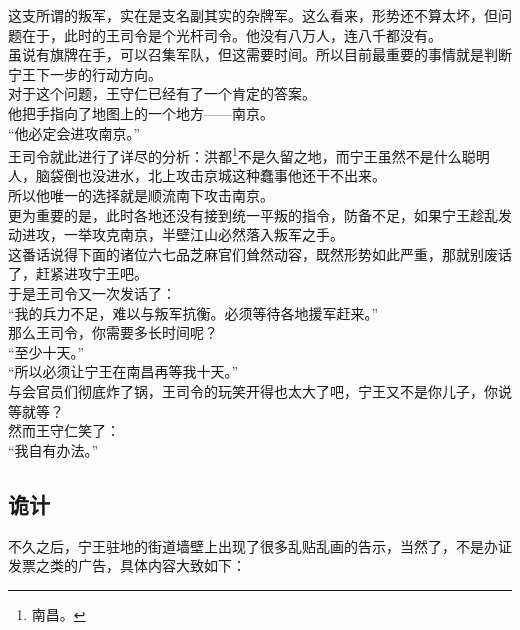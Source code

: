 \begin{multicols}{\theparacolNo}
这支所谓的叛军，实在是支名副其实的杂牌军。这么看来，形势还不算太坏，但问题在于，此时的王司令是个光杆司令。他没有八万人，连八千都没有。\\

虽说有旗牌在手，可以召集军队，但这需要时间。所以目前最重要的事情就是判断宁王下一步的行动方向。\\

对于这个问题，王守仁已经有了一个肯定的答案。\\

他把手指向了地图上的一个地方——南京。\\

“他必定会进攻南京。”\\

王司令就此进行了详尽的分析：洪都\footnote{南昌。}不是久留之地，而宁王虽然不是什么聪明人，脑袋倒也没进水，北上攻击京城这种蠢事他还干不出来。\\

所以他唯一的选择就是顺流南下攻击南京。\\

更为重要的是，此时各地还没有接到统一平叛的指令，防备不足，如果宁王趁乱发动进攻，一举攻克南京，半壁江山必然落入叛军之手。\\

这番话说得下面的诸位六七品芝麻官们耸然动容，既然形势如此严重，那就别废话了，赶紧进攻宁王吧。\\

于是王司令又一次发话了：\\

“我的兵力不足，难以与叛军抗衡。必须等待各地援军赶来。”\\

那么王司令，你需要多长时间呢？\\

“至少十天。”\\

“所以必须让宁王在南昌再等我十天。”\\

与会官员们彻底炸了锅，王司令的玩笑开得也太大了吧，宁王又不是你儿子，你说等就等？\\

然而王守仁笑了：\\

“我自有办法。”\\

\subsection{诡计}
不久之后，宁王驻地的街道墙壁上出现了很多乱贴乱画的告示，当然了，不是办证发票之类的广告，具体内容大致如下：\\


\end{multicols}
